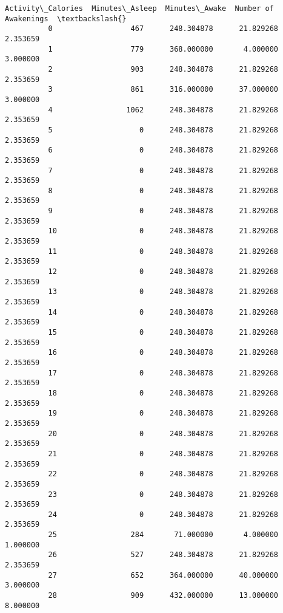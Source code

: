 \documentclass[11pt]{article}
\begin{document}
\begin{Verbatim}[commandchars=\\\{\}]
               Activity\_Calories  Minutes\_Asleep  Minutes\_Awake  Number of Awakenings  \textbackslash{}
          0                  467      248.304878      21.829268              2.353659   
          1                  779      368.000000       4.000000              3.000000   
          2                  903      248.304878      21.829268              2.353659   
          3                  861      316.000000      37.000000              3.000000   
          4                 1062      248.304878      21.829268              2.353659   
          5                    0      248.304878      21.829268              2.353659   
          6                    0      248.304878      21.829268              2.353659   
          7                    0      248.304878      21.829268              2.353659   
          8                    0      248.304878      21.829268              2.353659   
          9                    0      248.304878      21.829268              2.353659   
          10                   0      248.304878      21.829268              2.353659   
          11                   0      248.304878      21.829268              2.353659   
          12                   0      248.304878      21.829268              2.353659   
          13                   0      248.304878      21.829268              2.353659   
          14                   0      248.304878      21.829268              2.353659   
          15                   0      248.304878      21.829268              2.353659   
          16                   0      248.304878      21.829268              2.353659   
          17                   0      248.304878      21.829268              2.353659   
          18                   0      248.304878      21.829268              2.353659   
          19                   0      248.304878      21.829268              2.353659   
          20                   0      248.304878      21.829268              2.353659   
          21                   0      248.304878      21.829268              2.353659   
          22                   0      248.304878      21.829268              2.353659   
          23                   0      248.304878      21.829268              2.353659   
          24                   0      248.304878      21.829268              2.353659   
          25                 284       71.000000       4.000000              1.000000   
          26                 527      248.304878      21.829268              2.353659   
          27                 652      364.000000      40.000000              3.000000   
          28                 909      432.000000      13.000000              8.000000   

\end{Verbatim}
\end{document}
